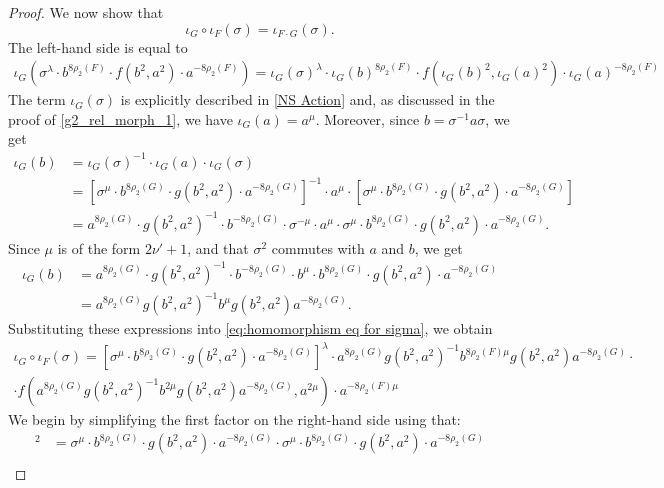 \documentclass{amsart}
\theoremstyle{definition}
\numberwithin{equation}{section}
\begin{document}
\begin{proof}
We now show that
    \[\iota_G\circ \iota_F(\sigma)=\iota_{F\cdot G}(\sigma).\]
The left-hand side is equal to 
    \begin{align}\label{eq:homomorphism eq for sigma}
        \iota_G(\sigma^{\lambda}\cdot {b}^{8\rho_2(F)}\cdot f({b}^2,a^2) \cdot a^{-8\rho_2(F)})=\iota_G(\sigma)^{\lambda}\cdot {\iota_G(b)}^{8\rho_2(F)}\cdot f({\iota_G(b)}^2,\iota_G(a)^2) \cdot \iota_G(a)^{-8\rho_2(F)}
    \end{align}
The term $\iota_G(\sigma)$ is explicitly described in \eqref{NS Action} and, as discussed in the proof of \eqref{g2_rel_morph_1}, we have $\iota_G(a)=a^\mu$. Moreover, since $b=\sigma^{-1}a\sigma$, we get 
    \begin{align*}
        \iota_G(b)&=\iota_G(\sigma)^{-1}  \cdot \iota_G(a)\cdot \iota_G(\sigma)\\
        &=[\sigma^{\mu}\cdot b^{8\rho_2(G)}\cdot g(b^2,a^2) \cdot a^{-8\rho_2(G)}]^{-1} \cdot a^\mu \cdot [\sigma^{\mu}\cdot b^{8\rho_2(G)}\cdot g(b^2,a^2) \cdot a^{-8\rho_2(G)}]\\
        &=a^{8\rho_2(G)}\cdot  g(b^2,a^2)^{-1} \cdot b^{-8\rho_2(G)}\cdot \sigma^{-\mu} \cdot a^\mu \cdot \sigma^{\mu}\cdot b^{8\rho_2(G)}\cdot g(b^2,a^2) \cdot a^{-8\rho_2(G)}.
    \end{align*}
Since $\mu$ is of the form $2\nu'+1$, and that $\sigma^2$ commutes with $a$ and $b$, we get
    \begin{align*}
        \iota_G(b)
        &=a^{8\rho_2(G)}\cdot  g(b^2,a^2)^{-1} \cdot b^{-8\rho_2(G)}\cdot  b^\mu \cdot b^{8\rho_2(G)}\cdot g(b^2,a^2) \cdot a^{-8\rho_2(G)}\\
        &=a^{8\rho_2(G)}  g(b^2,a^2)^{-1}  b^\mu g(b^2,a^2)  a^{-8\rho_2(G)}.
    \end{align*}
Substituting these expressions into \eqref{eq:homomorphism eq for sigma}, we obtain
    \begin{multline}\label{eq: homomorphism on sigma-2}
        \iota_G\circ \iota_F(\sigma)=[\sigma^{\mu}\cdot b^{8\rho_2(G)}\cdot g(b^2,a^2) \cdot a^{-8\rho_2(G)}]^\lambda \cdot a^{8\rho_2(G)}  g(b^2,a^2)^{-1}  b^{8\rho_2(F)\mu} g(b^2,a^2)  a^{-8\rho_2(G)}\cdot\\
         \cdot f(a^{8\rho_2(G)}  g(b^2,a^2)^{-1}  b^{2\mu} g(b^2,a^2)  a^{-8\rho_2(G)},a^{2\mu})\cdot a^{-8\rho_2(F)\mu}
    \end{multline}
We begin by simplifying the first factor on the right-hand side using that:
    \begin{align*}
        [\sigma^{\mu}\cdot b^{8\rho_2(G)}\cdot g(b^2,a^2) \cdot a^{-8\rho_2(G)}]^2&=\sigma^{\mu}\cdot b^{8\rho_2(G)}\cdot g(b^2,a^2) \cdot a^{-8\rho_2(G)}\cdot\sigma^{\mu}\cdot b^{8\rho_2(G)}\cdot g(b^2,a^2) \cdot a^{-8\rho_2(G)}\\

\end{align*}
\end{proof}
\end{document}
